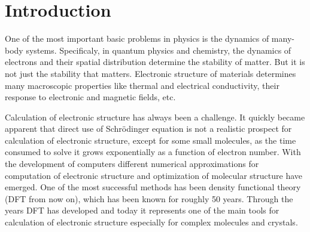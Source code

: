 \documentclass[openany, longbibliography,slovene,a4paper,12pt]{article}
\begin{document}
\section{Introduction}
One of the most important basic problems in physics is the dynamics of many-body
systems. Specificaly, in quantum physics and chemistry, the dynamics of
electrons and their spatial distribution determine the stability of matter. But
it is not just the stability that matters. Electronic structure of materials
determines many macroscopic properties like thermal and electrical conductivity, their response to electronic and magnetic fields, etc.

Calculation of electronic structure has always been a challenge. It quickly
became apparent that direct use of Schr{\"o}dinger equation is not a realistic
prospect for calculation of electronic structure, except for some small
molecules, as the time consumed to solve it grows exponentially
\cite{nobel_lecture} as a function of electron
number. With the development of computers different numerical approximations for
computation of electronic structure and optimization of molecular structure have
emerged. One of the most successful methods has been density functional theory
(DFT from now on), which has been known for roughly 50 years. Through the years DFT has developed and today it represents one of the main tools for calculation of electronic structure especially for complex molecules and crystals.
\end{document}
